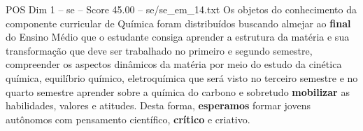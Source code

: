 \begin{textsample}{POS Dim 1 – se – Score 45.00 – se/se\_em\_14.txt}
Os objetos do conhecimento da componente curricular de Química foram distribuídos buscando almejar ao \textbf{final} do Ensino Médio que o estudante consiga aprender a estrutura da matéria e sua transformação que deve ser trabalhado no primeiro e segundo semestre, compreender os aspectos dinâmicos da matéria por meio do estudo da cinética química, equilíbrio químico, eletroquímica que será visto no terceiro semestre e no quarto semestre aprender sobre a química do carbono e sobretudo \textbf{mobilizar} as habilidades, valores e atitudes.
Desta forma, \textbf{esperamos} formar jovens autônomos com pensamento científico, \textbf{crítico} e criativo.

\end{textsample}
